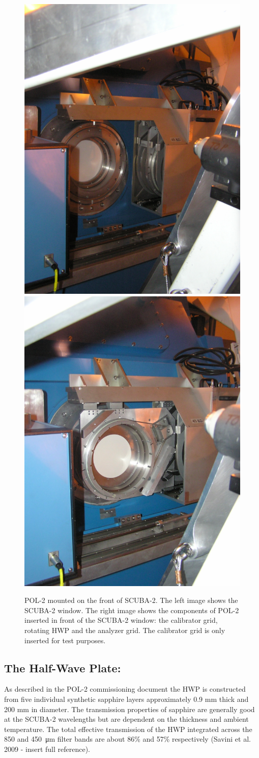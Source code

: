 \begin{figure}[t!]
\begin{center}
\includegraphics[width=0.45\linewidth]{pol2-out-of-beam.png}
\includegraphics[width=0.45\linewidth]{pol2-in-beam.png}
\label{fig:pol2sc2}
\caption [POL-2 mounted on SCUBA-2]{
  \small POL-2 mounted on the front of SCUBA-2.
  The left image shows the SCUBA-2
  window. The right image shows the components of POL-2 inserted
  in front of the SCUBA-2 window: the calibrator grid, rotating HWP
  and the analyzer grid. The calibrator grid is only inserted
  for test purposes.}
\end{center}
\end{figure}




\subsection*{The Half-Wave Plate:}

As described in the POL-2 commissioning document
the HWP is constructed from five individual synthetic sapphire layers approximately 0.9
mm thick and 200 mm in diameter. The transmission properties of sapphire
are generally good at the SCUBA-2 wavelengths but are dependent on the thickness and ambient
temperature. The total effective transmission of the HWP integrated across the 850
and \SI{450}{\micro\metre} filter bands are about 86\% and 57\% respectively
(Savini et al. 2009 - insert full reference).


